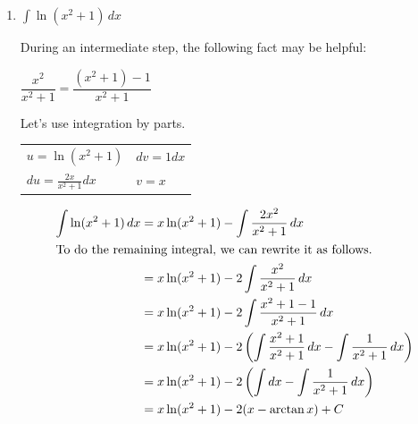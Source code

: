 \documentclass{article}
\begin{document}
\begin{enumerate}
\begin{solution}
First, let's use the substitution $u = \sin x$, $du = \cos x\, dx$.
\[\int \cos x \ln(\sin x)\, dx = \int \ln u \, du\]
Now we have $\int \ln u \, du$, which is $u\ln u - u +C$, as we've derived previously using integration by parts. 
\begin{align*}
    \int \cos x \ln(\sin x)\,dx &= \int \ln u \,du \\
    &= u\ln u - u + C \\
    &= (\sin x) \ln(\sin x) - \sin x + C
\end{align*}
\end{solution}
\pspace{\vfill}

\item $\displaystyle \int \ln(x^2+1)\,dx$ 
\begin{framed}
    During an intermediate step, the following fact may be helpful: 
    \begin{center}
        $\dfrac{x^2}{x^2+1}=\dfrac{(x^2+1)-1}{x^2+1}$
    \end{center}
\end{framed}

\begin{solution}
Let's use integration by parts.
\begin{center}
    \begin{tabular}{ l l }
  $u=\ln(x^2+1)$ &  $dv =1 dx$  \\
  $du=\frac{2x}{x^2+1}dx$ &  $v=x$  \\
\end{tabular}
\end{center} \vspace{-12pt}
\begin{align*}
    \int \ln(x^2+1)\,dx &= x\ln(x^2+1) - \int \frac{2x^2}{x^2+1}\,dx \\
    \intertext{To do the remaining integral, we can rewrite it as follows.}
    &= x\ln(x^2+1) - 2\int \frac{x^2}{x^2+1}\,dx \\
    &= x\ln(x^2+1) - 2\int \frac{x^2+1-1}{x^2+1}\,dx \\
    &= x\ln(x^2+1) - 2\left(\int \frac{x^2+1}{x^2+1}\,dx
        - \int \frac{1}{x^2+1}\,dx\right)\\
    &= x\ln(x^2+1) - 2\left(\int dx - \int \frac{1}{x^2+1}\,dx \right)\\
    &= x\ln(x^2+1) - 2(x - \arctan x) + C
\end{align*}
   
\end{solution}




\end{enumerate}
\end{document}
